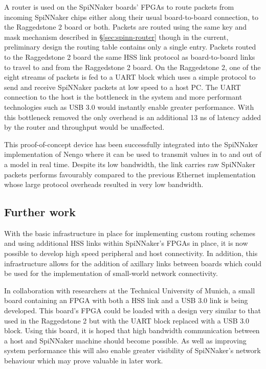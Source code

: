 				A router is used on the SpiNNaker boards' FPGAs to route packets from
				incoming SpiNNaker chips either along their usual board-to-board
				connection, to the Raggedstone 2 board or both.  Packets are routed
				using the same key and mask mechanism described in
				\S\ref{sec:spinn-router} though in the current, preliminary design the
				routing table contains only a single entry.  Packets routed to the
				Raggedstone 2 board the same HSS link protocol as board-to-board links
				to travel to and from the Raggedstone 2 board.  On the Raggedstone 2,
				one of the eight streams of packets is fed to a UART block which uses a
				simple protocol to send and receive SpiNNaker packets at low speed to a
				host PC. The UART connection to the host is the bottleneck in the system
				and more performant technologies such as USB 3.0 would instantly enable
				greater performance. With this bottleneck removed the only overhead is
				an additional 13 ns of latency added by the router and throughput would
				be unaffected.
				
				This proof-of-concept device has been successfully integrated into the
				SpiNNaker implementation of Nengo where it can be used to transmit
				values in to and out of a model in real time. Despite its low bandwidth,
				the link carries raw SpiNNaker packets performs favourably compared to
				the previous Ethernet implementation whose large protocol overheads
				resulted in very low bandwidth.
			
			\subsection{Further work}
				
				
				With the basic infrastructure in place for implementing custom routing
				schemes and using additional HSS links within SpiNNaker's FPGAs in
				place, it is now possible to develop high speed peripheral and host
				connectivity. In addition, this infrastructure allows for the addition
				of axillary links between boards which could be used for the
				implementation of small-world network connectivity.
				
				In collaboration with researchers at the Technical University of Munich,
				a small board containing an FPGA with both a HSS link and a USB 3.0 link
				is being developed. This board's FPGA could be loaded with a design very
				similar to that used in the Raggedstone 2 but with the UART block
				replaced with a USB 3.0 block. Using this board, it is hoped that high
				bandwidth communication between a host and SpiNNaker machine should
				become possible. As well as improving system performance this will also
				enable greater visibility of SpiNNaker's network behaviour which may
				prove valuable in later work.

